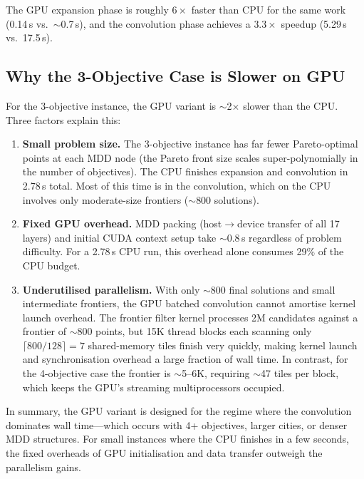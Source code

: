 \documentclass[11pt]{article}
\begin{document}
The GPU expansion phase is roughly $6\times$ faster than CPU for the
same work (0.14\,s vs.\ $\sim$0.7\,s), and the convolution phase
achieves a $3.3\times$ speedup (5.29\,s vs.\ 17.5\,s).

\subsection{Why the 3-Objective Case is Slower on GPU}

For the 3-objective instance, the GPU variant is $\sim$2$\times$ slower
than the CPU.  Three factors explain this:

\begin{enumerate}
  \item \textbf{Small problem size.}
        The 3-objective instance has far fewer Pareto-optimal points at
        each MDD node (the Pareto front size scales super-polynomially
        in the number of objectives).
        The CPU finishes expansion and convolution in 2.78\,s total.
        Most of this time is in the convolution, which on the CPU involves
        only moderate-size frontiers ($\sim$800 solutions).

  \item \textbf{Fixed GPU overhead.}
        MDD packing (host$\to$device transfer of all 17 layers) and
        initial CUDA context setup take $\sim$0.8\,s regardless of
        problem difficulty.
        For a 2.78\,s CPU run, this overhead alone consumes 29\% of
        the CPU budget.

  \item \textbf{Underutilised parallelism.}
        With only $\sim$800 final solutions and small intermediate
        frontiers, the GPU batched convolution cannot amortise kernel
        launch overhead.
        The frontier filter kernel processes 2M candidates against a
        frontier of $\sim$800 points, but 15K thread blocks each scanning
        only $\lceil 800/128 \rceil = 7$ shared-memory tiles finish
        very quickly, making kernel launch and synchronisation overhead
        a large fraction of wall time.
        In contrast, for the 4-objective case the frontier is
        $\sim$5--6K, requiring $\sim$47 tiles per block, which keeps
        the GPU's streaming multiprocessors occupied.
\end{enumerate}

In summary, the GPU variant is designed for the regime where the
convolution dominates wall time---which occurs with 4+ objectives,
larger cities, or denser MDD structures.
For small instances where the CPU finishes in a few seconds, the fixed
overheads of GPU initialisation and data transfer outweigh the
parallelism gains.
\end{document}
